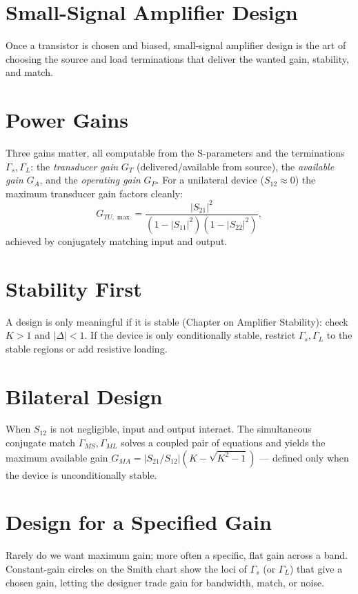 \section{Small-Signal Amplifier Design}\label{sec:tb_ssamp}



Once a transistor is chosen and biased, small-signal amplifier design is the art
of choosing the source and load terminations that deliver the wanted gain,
stability, and match.

\section{Power Gains}
Three gains matter, all computable from the S-parameters and the terminations
$\Gamma_s,\Gamma_L$: the \emph{transducer gain} $G_T$ (delivered/available from
source), the \emph{available gain} $G_A$, and the \emph{operating gain} $G_P$.
For a unilateral device ($S_{12}\!\approx\!0$) the maximum transducer gain
factors cleanly:
\[ G_{TU,\max} = \frac{|S_{21}|^2}{(1-|S_{11}|^2)(1-|S_{22}|^2)}, \]
achieved by conjugately matching input and output.

\section{Stability First}
A design is only meaningful if it is stable (Chapter on Amplifier Stability):
check $K>1$ and $|\Delta|<1$. If the device is only conditionally stable, restrict
$\Gamma_s,\Gamma_L$ to the stable regions or add resistive loading.

\section{Bilateral Design}
When $S_{12}$ is not negligible, input and output interact. The simultaneous
conjugate match $\Gamma_{MS},\Gamma_{ML}$ solves a coupled pair of equations and
yields the maximum available gain $G_{MA}=|S_{21}/S_{12}|(K-\sqrt{K^2-1})$ ---
defined only when the device is unconditionally stable.

\section{Design for a Specified Gain}
Rarely do we want maximum gain; more often a specific, flat gain across a band.
Constant-gain circles on the Smith chart show the loci of $\Gamma_s$ (or
$\Gamma_L$) that give a chosen gain, letting the designer trade gain for
bandwidth, match, or noise.



